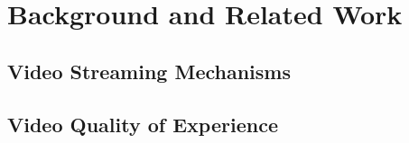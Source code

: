 \section{Background and Related Work}
\subsection{Video Streaming Mechanisms}
\subsection{Video Quality of Experience}
